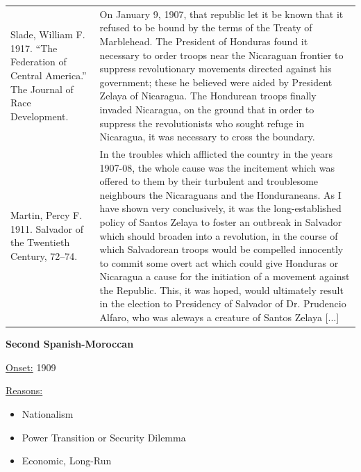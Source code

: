 {\begin{longtable}{p{}p{}}
\\
Slade, William F. 1917. “The Federation of Central America.” The Journal of Race Development. & On January 9, 1907, that republic let it be known that it refused to be bound by the terms of the Treaty of Marblehead. The President of Honduras found it necessary to order troops near the Nicaraguan frontier to suppress revolutionary movements directed against his government; these he believed were aided by President Zelaya of Nicaragua. The Hondurean troops finally invaded Nicaragua, on the ground that in order to suppress the revolutionists who sought refuge in Nicaragua, it was necessary to cross the boundary. 
\\
Martin, Percy F. 1911. Salvador of the Twentieth Century, 72–74. & In the troubles which afflicted the country in the years 1907-08, the whole cause was the incitement which was offered to them by their turbulent and troublesome neighbours the Nicaraguans and the Honduraneans. As I have shown very conclusively, it was the long-established policy of Santos Zelaya to foster an outbreak in Salvador which should broaden into a revolution, in the course of which Salvadorean troops would be compelled innocently to commit some overt act which could give Honduras or Nicaragua a cause for the initiation of a movement against the Republic. This, it was hoped, would ultimately result in the election to Presidency of Salvador of Dr. Prudencio Alfaro, who was aleways a creature of Santos Zelaya [...]
\\
\end{longtable}}
\clearpage
         \textbf{Second Spanish-Moroccan} 

          \underline{Onset:} 1909         

\underline{Reasons:}
\begin{itemize}
\item Nationalism
\item Power Transition or Security Dilemma
\item Economic, Long-Run
\end{itemize}

